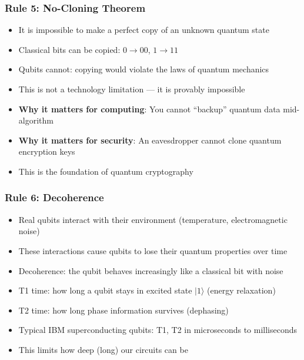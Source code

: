 \begin{frame}[fragile]\frametitle{Rule 5: No-Cloning Theorem}
\begin{itemize}
\item It is impossible to make a perfect copy of an unknown quantum state
\item Classical bits can be copied: $0 \to 00$, $1 \to 11$
\item Qubits cannot: copying would violate the laws of quantum mechanics
\item This is not a technology limitation --- it is provably impossible
\item \textbf{Why it matters for computing}: You cannot ``backup'' quantum data mid-algorithm
\item \textbf{Why it matters for security}: An eavesdropper cannot clone quantum encryption keys
\item This is the foundation of quantum cryptography
\end{itemize}
\end{frame}

\begin{frame}[fragile]\frametitle{Rule 6: Decoherence}
\begin{itemize}
\item Real qubits interact with their environment (temperature, electromagnetic noise)
\item These interactions cause qubits to lose their quantum properties over time
\item Decoherence: the qubit behaves increasingly like a classical bit with noise
\item T1 time: how long a qubit stays in excited state $|1\rangle$ (energy relaxation)
\item T2 time: how long phase information survives (dephasing)
\item Typical IBM superconducting qubits: T1, T2 in microseconds to milliseconds
\item This limits how deep (long) our circuits can be
\end{itemize}
\end{frame}

